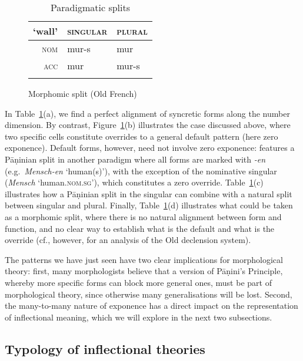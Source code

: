 \documentclass[output=paper
 	        ,biblatex
                ,babelshorthands
                ,newtxmath
                ,draftmode
                ,colorlinks, citecolor=brown
]{langscibook}
\begin{document}
\begin{table}
\begin{subfigure}{.50\textwidth}
    \centering
    \begin{tabular}{r|ll}
      \lsptoprule
      `wall' & \textsc{singular} & \textsc{plural}\\
      \midrule
      \textsc{nom} & mur-s & mur\\
      \textsc{acc} & mur & mur-s\\
      \lspbottomrule
    \end{tabular}

    \caption{Morphomic split (Old French)}
  \end{subfigure}
  
  
  \caption{Paradigmatic splits}
  \label{tab:ParaSplit}
\end{table}

In Table~\ref{tab:ParaSplit}(a), we find a perfect alignment of
syncretic forms along the number dimension. By contrast,
Figure~\ref{tab:ParaSplit}(b) illustrates the case discussed above,
where two specific cells constitute overrides to a general default
pattern (here zero exponence). Default forms, however, need not
involve zero exponence:  features a Pāṇinian split in another
paradigm where all forms are marked with \textit{-en}
(e.g.\ \textit{Mensch-en} `human(s)'), with the exception of the
nominative singular (\textit{Mensch} `human\textsc{.nom.sg}'), which
constitutes a zero override. Table~\ref{tab:ParaSplit}(c) illustrates
how a Pāṇinian split in the singular can combine with a natural split
between singular and plural. Finally, Table~\ref{tab:ParaSplit}(d)
illustrates what could be taken as a morphomic split, where there is no
natural alignment between form and function, and no clear way to
establish what is the default and what is the override (cf., however,
\citealt{Crysmann:Kihm:2018} for an analysis of the Old 
declension system).

The patterns we have just seen have two clear implications for
morphological theory: first, many morphologists believe that
a version of Pāṇini's Principle, whereby more specific forms can block
more general ones, must be part of morphological theory, since
otherwise many generalisations will be lost. 
Second, the many-to-many nature of exponence has a direct impact on
the representation of inflectional meaning, which we will explore in
the next two subsections. 

\subsection{Typology of inflectional theories}
\label{sec:InflTypology}
\end{document}
